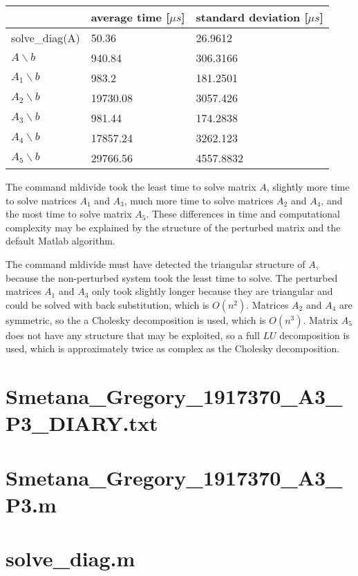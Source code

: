 \documentclass[11pt]{article} %
\begin{document}
\begin{table}[h!]
\centering
\begin{tabular}{| l | l | l |}\hline
 & average time [$\mu s$] & standard deviation [$\mu s$] \\ \hline
solve\_diag(A) & 50.36& 26.9612\\ \hline
$A\backslash b$ & 940.84 &306.3166\\ \hline
$A_1\backslash b$ &983.2&181.2501 \\ \hline
$A_2\backslash b$ & 19730.08 & 3057.426\\ \hline
$A_3\backslash b$ &981.44 & 174.2838\\ \hline
$A_4\backslash b$ & 17857.24 & 3262.123 \\ \hline
$A_5\backslash b$ & 29766.56 & 4557.8832\\ \hline 
\end{tabular}
\caption{}
\label{tab:3b}

\end{table}
The command mldivide took the least time to solve matrix $A$, slightly more time to solve matrices $A_1$ and $A_3$, much more time to solve matrices $A_2$ and $A_4$, and the most time to solve matrix $A_5$. These differences in time and computational complexity may be explained by the structure of the perturbed matrix and the default Matlab algorithm.

The command mldivide must have detected the triangular structure of $A$, because the non-perturbed system took the least time to solve. The perturbed matrices $A_1$ and $A_3$ only took slightly longer because they are triangular and could be solved with back substitution, which is $O(n^2)$. Matrices $A_2$ and $A_4$ are symmetric, so the a Cholesky decomposition is used, which is $O(n^3)$. Matrix $A_5$ does not  have any structure that may be exploited, so a full $LU$ decomposition is used, which is approximately twice as complex as the Cholesky decomposition.

\clearpage
\appendix
\section{Smetana\_Gregory\_1917370\_A3\_P3\_DIARY.txt}


\section{Smetana\_Gregory\_1917370\_A3\_P3.m}


\section{solve\_diag.m}

\end{document}
